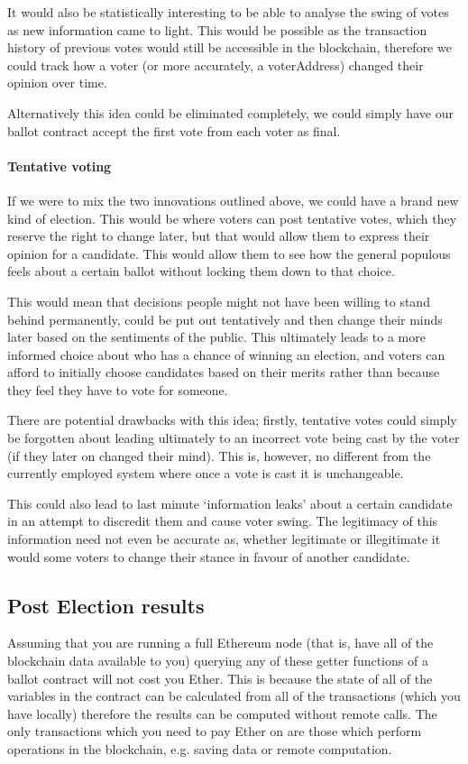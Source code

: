 \documentclass{article}
\begin{document}
It would also be statistically interesting to be able to analyse the swing of votes as new information came to light. This would be possible as the transaction history of previous votes would still be accessible in the blockchain, therefore we could track how a voter (or more accurately, a voterAddress) changed their opinion over time.

Alternatively this idea could be eliminated completely, we could simply have our ballot contract accept the first vote from each voter as final.

\clearpage
\paragraph{Tentative voting}
\hfill \break
If we were to mix the two innovations outlined above, we could have a brand new kind of election. This would be where voters can post tentative votes, which they reserve the right to change later, but that would allow them to express their opinion for a candidate. This would allow them to see how the general populous feels about a certain ballot without locking them down to that choice.

This would mean that decisions people might not have been willing to stand behind permanently, could be put out tentatively and then change their minds later based on the sentiments of the public. This ultimately leads to a more informed choice about who has a chance of winning an election, and voters can afford to initially choose candidates based on their merits rather than because they feel they have to vote for someone.

There are potential drawbacks with this idea; firstly, tentative votes could simply be forgotten about leading ultimately to an incorrect vote being cast by the voter (if they later on changed their mind). This is, however, no different from the currently employed system where once a vote is cast it is unchangeable. 

This could also lead to last minute `information leaks' about a certain candidate in an attempt to discredit them and cause voter swing. The legitimacy of this information need not even be accurate as, whether legitimate or illegitimate it would some voters to change their stance in favour of another candidate.

\clearpage
\subsection{Post Election results}
Assuming that you are running a full Ethereum node (that is, have all of the blockchain data available to you) querying any of these getter functions of a ballot contract will not cost you Ether. This is because the state of all of the variables in the contract can be calculated from all of the transactions (which you have locally) therefore the results can be computed without remote calls. The only transactions which you need to pay Ether on are those which perform operations in the blockchain, e.g. saving data or remote computation.
\end{document}

